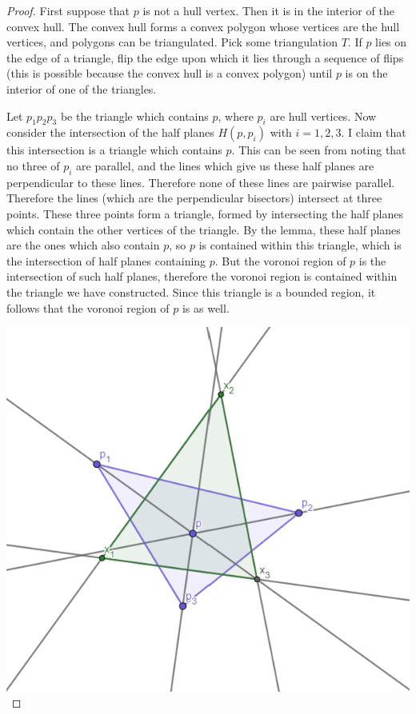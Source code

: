 \documentclass[12pt]{article}
\theoremstyle{definition}
\begin{document}
\begin{proof}
First suppose that $p$ is not a hull vertex. Then it is in the interior of the convex hull. The convex hull forms a convex polygon whose vertices are the hull vertices, and polygons can be triangulated. Pick some triangulation $T$. If $p$ lies on the edge of a triangle, flip the edge upon which it lies through a sequence of flips (this is possible because the convex hull is a convex polygon) until $p$ is on the interior of one of the triangles. 

Let $p_1p_2p_3$ be the triangle which contains $p$, where $p_i$ are hull vertices. Now consider the intersection of the half planes $H(p,p_i)$ with $i = 1,2,3$. I claim that this intersection is a triangle which contains $p$. This can be seen from noting that no three of $p_i$ are parallel, and the lines which give us these half planes are perpendicular to these lines. Therefore none of these lines are pairwise parallel. Therefore the lines (which are the perpendicular bisectors) intersect at three points. These three points form a triangle, formed by intersecting the half planes which contain the other vertices of the triangle. By the lemma, these half planes are the ones which also contain $p$, so $p$ is contained within this triangle, which is the intersection of half planes containing $p$. But the voronoi region of $p$ is the intersection of such half planes, therefore the voronoi region is contained within the triangle we have constructed. Since this triangle is a bounded region, it follows that the voronoi region of $p$ is as well. 


\includegraphics[scale=1]{bounded_region_triangle.png} 


\end{proof}
\end{document}
